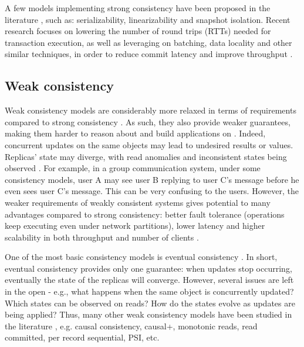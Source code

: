 A few models implementing strong consistency have been proposed in the literature \cite{linearizability,si}, such as: serializability, linearizability and snapshot isolation.
Recent research focuses on lowering the number of round trips (RTTs) needed for transaction execution, as well as leveraging on batching, data locality and other similar techniques, in order to reduce commit latency and improve throughput \cite{sconekv,caerus,detock,slog,tdsql}. %

\subsection{Weak consistency}
\label{subsec:weak}

Weak consistency models are considerably more relaxed in terms of requirements compared to strong consistency \cite{understandingEC}.
As such, they also provide weaker guarantees, making them harder to reason about and build applications on \cite{bargain,sconekv,slog,cops,cure,chainreaction,dynamo}.
Indeed, concurrent updates on the same objects may lead to undesired results or values.
Replicas' state may diverge, with read anomalies and inconsistent states being observed \cite{bargain,detock,slog,cops,cure,dynamo}.
For example, in a group communication system, under some consistency models, user A may see user B replying to user C's message before he even sees user C's message.
This can be very confusing to the users.
However, the weaker requirements of weakly consistent systems gives potential to many advantages compared to strong consistency: better fault tolerance (operations keep executing even under network partitions), lower latency and higher scalability in both throughput and number of clients \cite{slog,cops,cure,dynamo,bargain}.

One of the most basic consistency models is eventual consistency \cite{understandingEC}.
In short, eventual consistency provides only one guarantee: when updates stop occurring, eventually the state of the replicas will converge.
However, several issues are left in the open - e.g., what happens when the same object is concurrently updated? Which states can be observed on reads? How do the states evolve as updates are being applied?
Thus, many other weak consistency models have been studied in the literature \cite{understandingEC, session, cops, dynamo, cassandra, walter, pnuts}, e.g. causal consistency, causal+, monotonic reads, read committed, per record sequential, PSI, etc.

